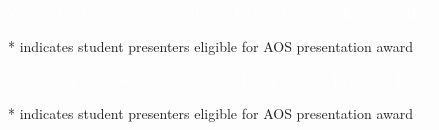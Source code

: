 \documentclass[twoside]{article}
\begin{document}

\thispagestyle{empty}
\pagestyle{fancy}

\setlength{\parindent}{0cm}

\newcommand\posterentry[3]{%
	\begin{minipage}{\linewidth}
	\raggedright
	#1 \textbf{#2} \\ #3 \\
	\vspace{8pt}
	\end{minipage}
}

\begin{shaded}
\Huge{\textcolor{white}{Wednesday Poster Session \normalsize 7:30--9:30 PM La Perouse - Explorers Hall}}
\end{shaded}

* indicates student presenters eligible for AOS presentation award
 
\begin{multicols}{2}

\normalsize


\end{multicols}

\newpage

\begin{shaded}
\Huge{\textcolor{white}{Thursday Poster Session \normalsize 7:00--9:00 PM La Perouse - Explorers Hall}}
\end{shaded}

* indicates student presenters eligible for AOS presentation award

\begin{multicols}{2}

\normalsize


\end{multicols}

%
\end{document}
